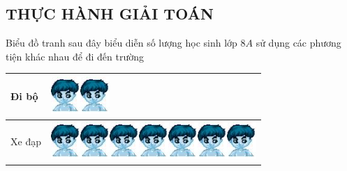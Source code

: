 \subsection{THỰC HÀNH GIẢI TOÁN}
\begin{vd}
	Biểu đồ tranh sau đây biểu diễn số lượng học sinh lớp $8A$ sử dụng các phương tiện khác nhau để đi đến trường
	\begin{center}
		\renewcommand{\arraystretch}{1.4}
		\begin{tabular}{|l|l|}
			\hline
			Đi bộ	 &  \includegraphics[scale=0.4]{hs}\includegraphics[scale=0.4]{hs} \\
			\hline
			Xe đạp 	  &  \includegraphics[scale=0.4]{hs}\includegraphics[scale=0.4]{hs}\includegraphics[scale=0.4]{hs}\includegraphics[scale=0.4]{hs}\includegraphics[scale=0.4]{hs}\includegraphics[scale=0.4]{hs}\includegraphics[scale=0.4]{hs}        \\

\end{tabular}
\end{center}
\end{vd}
